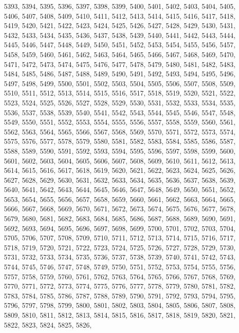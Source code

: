 5393,
5394,
5395,
5396,
5397,
5398,
5399,
5400,
5401,
5402,
5403,
5404,
5405,
5406,
5407,
5408,
5409,
5410,
5411,
5412,
5413,
5414,
5415,
5416,
5417,
5418,
5419,
5420,
5421,
5422,
5423,
5424,
5425,
5426,
5427,
5428,
5429,
5430,
5431,
5432,
5433,
5434,
5435,
5436,
5437,
5438,
5439,
5440,
5441,
5442,
5443,
5444,
5445,
5446,
5447,
5448,
5449,
5450,
5451,
5452,
5453,
5454,
5455,
5456,
5457,
5458,
5459,
5460,
5461,
5462,
5463,
5464,
5465,
5466,
5467,
5468,
5469,
5470,
5471,
5472,
5473,
5474,
5475,
5476,
5477,
5478,
5479,
5480,
5481,
5482,
5483,
5484,
5485,
5486,
5487,
5488,
5489,
5490,
5491,
5492,
5493,
5494,
5495,
5496,
5497,
5498,
5499,
5500,
5501,
5502,
5503,
5504,
5505,
5506,
5507,
5508,
5509,
5510,
5511,
5512,
5513,
5514,
5515,
5516,
5517,
5518,
5519,
5520,
5521,
5522,
5523,
5524,
5525,
5526,
5527,
5528,
5529,
5530,
5531,
5532,
5533,
5534,
5535,
5536,
5537,
5538,
5539,
5540,
5541,
5542,
5543,
5544,
5545,
5546,
5547,
5548,
5549,
5550,
5551,
5552,
5553,
5554,
5555,
5556,
5557,
5558,
5559,
5560,
5561,
5562,
5563,
5564,
5565,
5566,
5567,
5568,
5569,
5570,
5571,
5572,
5573,
5574,
5575,
5576,
5577,
5578,
5579,
5580,
5581,
5582,
5583,
5584,
5585,
5586,
5587,
5588,
5589,
5590,
5591,
5592,
5593,
5594,
5595,
5596,
5597,
5598,
5599,
5600,
5601,
5602,
5603,
5604,
5605,
5606,
5607,
5608,
5609,
5610,
5611,
5612,
5613,
5614,
5615,
5616,
5617,
5618,
5619,
5620,
5621,
5622,
5623,
5624,
5625,
5626,
5627,
5628,
5629,
5630,
5631,
5632,
5633,
5634,
5635,
5636,
5637,
5638,
5639,
5640,
5641,
5642,
5643,
5644,
5645,
5646,
5647,
5648,
5649,
5650,
5651,
5652,
5653,
5654,
5655,
5656,
5657,
5658,
5659,
5660,
5661,
5662,
5663,
5664,
5665,
5666,
5667,
5668,
5669,
5670,
5671,
5672,
5673,
5674,
5675,
5676,
5677,
5678,
5679,
5680,
5681,
5682,
5683,
5684,
5685,
5686,
5687,
5688,
5689,
5690,
5691,
5692,
5693,
5694,
5695,
5696,
5697,
5698,
5699,
5700,
5701,
5702,
5703,
5704,
5705,
5706,
5707,
5708,
5709,
5710,
5711,
5712,
5713,
5714,
5715,
5716,
5717,
5718,
5719,
5720,
5721,
5722,
5723,
5724,
5725,
5726,
5727,
5728,
5729,
5730,
5731,
5732,
5733,
5734,
5735,
5736,
5737,
5738,
5739,
5740,
5741,
5742,
5743,
5744,
5745,
5746,
5747,
5748,
5749,
5750,
5751,
5752,
5753,
5754,
5755,
5756,
5757,
5758,
5759,
5760,
5761,
5762,
5763,
5764,
5765,
5766,
5767,
5768,
5769,
5770,
5771,
5772,
5773,
5774,
5775,
5776,
5777,
5778,
5779,
5780,
5781,
5782,
5783,
5784,
5785,
5786,
5787,
5788,
5789,
5790,
5791,
5792,
5793,
5794,
5795,
5796,
5797,
5798,
5799,
5800,
5801,
5802,
5803,
5804,
5805,
5806,
5807,
5808,
5809,
5810,
5811,
5812,
5813,
5814,
5815,
5816,
5817,
5818,
5819,
5820,
5821,
5822,
5823,
5824,
5825,
5826,
